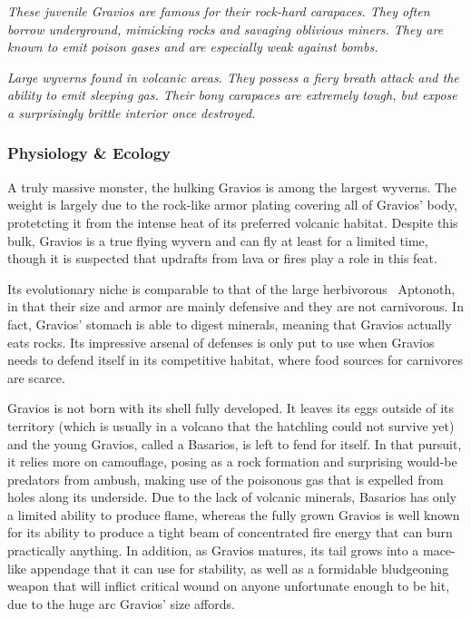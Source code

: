 \textit{These juvenile Gravios are famous for their rock-hard carapaces. They often borrow underground, mimicking rocks and savaging oblivious miners. They are known to emit poison gases and are especially weak against bombs.}

\textit{Large wyverns found in volcanic areas. They possess a fiery breath attack and the ability to emit sleeping gas. Their bony carapaces are extremely tough, but expose a surprisingly brittle interior once destroyed.}\par{}
\subsubsection{Physiology \& Ecology}
A truly massive monster, the hulking Gravios is among the largest wyverns. The weight is largely due to the rock-like armor plating covering all of Gravios' body, protetcting it from the intense heat of its preferred volcanic habitat. Despite this bulk, Gravios is a true flying wyvern and can fly at least for a limited time, though it is suspected that updrafts from lava or fires play a role in this feat.

Its evolutionary niche is comparable to that of the large herbivorous ~Aptonoth, in that their size and armor are mainly defensive and they are not carnivorous. In fact, Gravios' stomach is able to digest minerals, meaning that Gravios actually eats rocks. Its impressive arsenal of defenses is only put to use when Gravios needs to defend itself in its competitive habitat, where food sources for carnivores are scarce.

Gravios is not born with its shell fully developed. It leaves its eggs outside of its territory (which is usually in a volcano that the hatchling could not survive yet) and the young Gravios, called a Basarios, is left to fend for itself. In that pursuit, it relies more on camouflage, posing as a rock formation and surprising would-be predators from ambush, making use of the poisonous gas that is expelled from holes along its underside. Due to the lack of volcanic minerals, Basarios has only a limited ability to produce flame, whereas the fully grown Gravios is well known for its ability to produce a tight beam of concentrated fire energy that can burn practically anything. In addition, as Gravios matures, its tail grows into a mace-like appendage that it can use for stability, as well as a formidable bludgeoning weapon that will inflict critical wound on anyone unfortunate enough to be hit, due to the huge arc Gravios' size affords.

